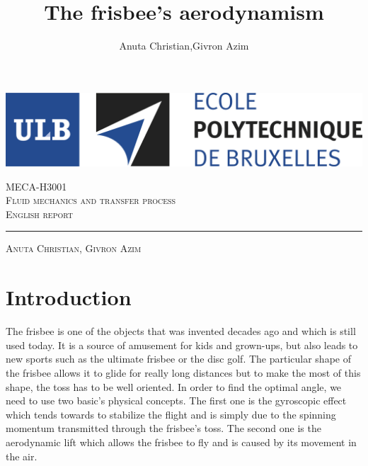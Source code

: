 \documentclass[10pt,a4paper]{report}
\author{Anuta Christian,Givron Azim}
\title{The frisbee's aerodynamism}
\begin{document}
\begin{titlepage}

\includegraphics[scale=0.5]{logo-polytech-ULB-FR.jpg}

\center 
\vspace{5cm}
\textsc{\large MECA-H3001} \\[0.5cm]
\textsc{\LARGE Fluid mechanics and transfer process} \\[1.5cm]
\textsc{\Large English report} %

\rule{\textwidth}{1pt}

\vspace{2cm}

\textsc{\large Anuta Christian, Givron Azim}

\end{titlepage}



\tableofcontents
\newpage 
\section{Introduction}
The frisbee is one of the objects that was invented decades ago and which is still used today. It is a source of amusement for kids and grown-ups, but also leads to new sports such as the ultimate frisbee or the disc golf. The particular shape of the frisbee allows it to glide for really long distances but to make the most of this shape, the toss has to be well oriented. In order to find the optimal angle, we need to use two basic’s physical concepts. The first one is the gyroscopic effect which tends towards to stabilize the flight and is simply due to the spinning momentum transmitted through the frisbee’s toss. The second one is the aerodynamic lift which allows the frisbee to fly and is caused by its movement in the air.
\end{document}
